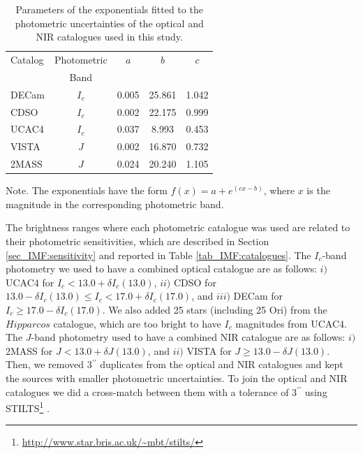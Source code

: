 \documentclass[12pt]{article}
\newcounter{subsubsubsection}[subsubsection]
\begin{document}
\begin{table}
\caption[Parameters of the exponentials fitted to the photometric errors of the optical and NIR catalogues.]{Parameters of the exponentials fitted to the photometric uncertainties of the optical and NIR catalogues used in this study.}
  \small
  \label{tab_IMF:errors}
  \setlength{\tabcolsep}{18pt}
  \begin{center}
  \begin{threeparttable}
 	\begin{tabular}{lcccc}
 	\hline
 	\hline
 	Catalog & Photometric &  $a$  &  $b$   & $c$   \\
			& Band        &       &        &       \\
 	\hline
 	DECam   & $I_c$	& 0.005 & 25.861 & 1.042 \\
 	CDSO    & $I_c$	& 0.002 & 22.175 & 0.999 \\
 	UCAC4   & $I_c$	& 0.037 & 8.993  & 0.453 \\
 	VISTA   & $J$	& 0.002 & 16.870 & 0.732 \\
 	2MASS   & $J$	& 0.024 & 20.240 & 1.105 \\
 	\hline
 	\end{tabular}
  \begin{tablenotes}
	Note. The exponentials have the form $f(x)=a+e^{(cx-b)}$, where $x$ is the magnitude in the corresponding photometric band.
  \end{tablenotes}
 \end{threeparttable}
 \end{center}
\end{table}

\label{sec_IMF:cutoffs}
The brightness ranges where each photometric catalogue was used are related to their photometric sensitivities, which are described in Section \ref{sec_IMF:sensitivity} and reported in Table \ref{tab_IMF:catalogues}. The $I_c$-band photometry we used to have a combined optical catalogue are as follows: $i)$ UCAC4 for $I_c<13.0+\delta I_c(13.0)$, $ii)$ CDSO for $13.0-\delta I_c(13.0)\leq I_c<17.0+\delta I_c(17.0)$, and $iii)$ DECam for $I_c\geq 17.0-\delta I_c(17.0)$. We also added 25 stars (including 25 Ori) from the $Hipparcos$ catalogue, which are too bright to have $I_c$ magnitudes from UCAC4. The $J$-band photometry used to have a combined NIR catalogue are as follows: $i)$ 2MASS for $J<13.0+\delta J(13.0)$, and $ii)$ VISTA for $J\geq 13.0-\delta J(13.0)$. Then, we removed 3$^{\prime\prime}$ duplicates from the optical and NIR catalogues and kept the sources with smaller photometric uncertainties. To join the optical and NIR catalogues we did a cross-match between them with a tolerance of 3$^{\prime\prime}$ using STILTS\footnote{\url{http://www.star.bris.ac.uk/~mbt/stilts/}} \citep{Taylor2006}.
\end{document}
